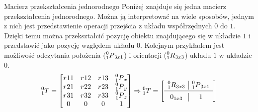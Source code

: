 
\begin{frame}
{Macierz przekształcenia jednorodnego}
Poniżej znajduje się jedna macierz przekształcenia jednorodnego. 
Można ją interpretować na wiele sposobów, jednym z nich jest przedstawienie operacji przejścia z układu współrzędnych $0$ do $1$. 
Dzięki temu można przekształcić pozycję obiektu znajdującego się w układzie $1$ i przedstawić jako pozycję względem układu $0$.
Kolejnym przykładem jest możliwość odczytania położenia ($\prescript{0}{1}P_{3x1}$) i orientacji ($\prescript{0}{1}R_{3x3}$) układu $1$ w układzie $0$.
\begin{equation*}
	\prescript{0}{1}T = 
	\begin{bmatrix}
		r_{}11 	& r_{}12	&	r_{}13	& \prescript{0}{1}P_x \\
		r_{}21 	& r_{}22	&	r_{}23	& \prescript{0}{1}P_y \\
		r_{}31 	& r_{}32	& r_{}33	& \prescript{0}{1}P_z \\
		0				&	0				&	0				&	1										\\
	\end{bmatrix}
	\Rightarrow
		\prescript{0}{1}T = 
	 \left[ \begin{array}{c|c}
   \prescript{0}{1}R_{3x3} 	& \prescript{0}{1}P_{3x1} \\
   \midrule
   0_{1x3}									& 1												\\
\end{array}\right]
\end{equation*}
\end{frame}



